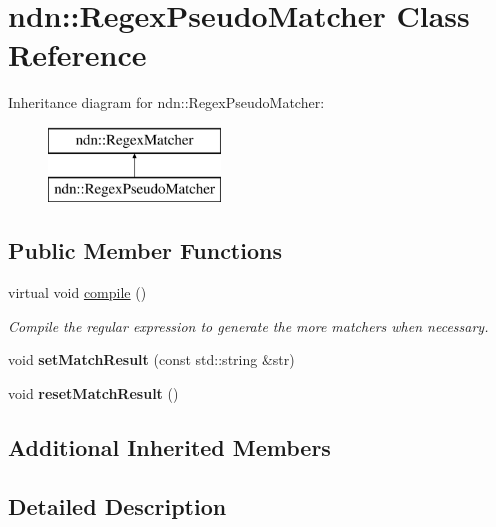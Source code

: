 \hypertarget{classndn_1_1RegexPseudoMatcher}{}\section{ndn\+:\+:Regex\+Pseudo\+Matcher Class Reference}
\label{classndn_1_1RegexPseudoMatcher}
Inheritance diagram for ndn\+:\+:Regex\+Pseudo\+Matcher\+:\begin{figure}[H]
\begin{center}
\leavevmode
\includegraphics[height=2.000000cm]{classndn_1_1RegexPseudoMatcher}
\end{center}
\end{figure}
\subsection*{Public Member Functions}
\begin{DoxyCompactItemize}
\item 
virtual void \hyperlink{classndn_1_1RegexPseudoMatcher_a4acf88fdf630d701e853af974dd48054}{compile} ()
\begin{DoxyCompactList}\small\item\em Compile the regular expression to generate the more matchers when necessary. \end{DoxyCompactList}\item 
void {\bfseries set\+Match\+Result} (const std\+::string \&str)\hypertarget{classndn_1_1RegexPseudoMatcher_a0a67b6386c8b745ec6369c7edf72c1a2}{}\label{classndn_1_1RegexPseudoMatcher_a0a67b6386c8b745ec6369c7edf72c1a2}

\item 
void {\bfseries reset\+Match\+Result} ()\hypertarget{classndn_1_1RegexPseudoMatcher_a333061cc8e0596593fee71c7653ad289}{}\label{classndn_1_1RegexPseudoMatcher_a333061cc8e0596593fee71c7653ad289}

\end{DoxyCompactItemize}
\subsection*{Additional Inherited Members}


\subsection{Detailed Description}


